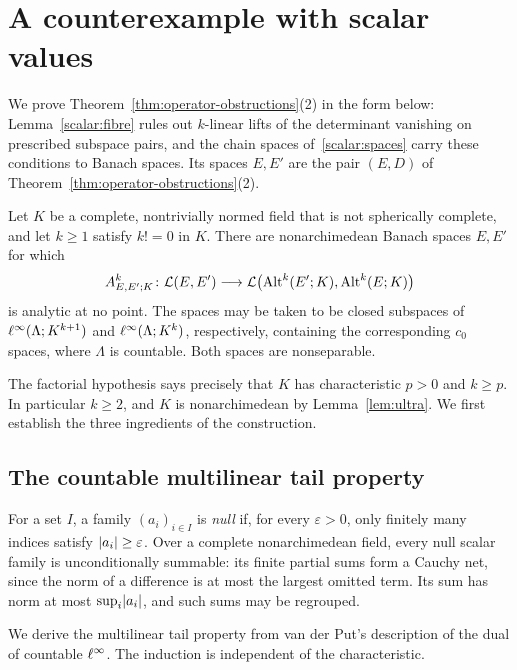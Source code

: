 \section{A counterexample with scalar values}\label{app:scalar}

We prove Theorem~\ref{thm:operator-obstructions}(2) in the form below: Lemma~\ref{scalar:fibre} rules out $k$\nobreakdash-linear
lifts of the determinant vanishing on prescribed subspace pairs, and the chain spaces of~\eqref{scalar:spaces} carry
these conditions to Banach spaces. Its spaces $E,E'$ are the pair $(E,D)$ of Theorem~\ref{thm:operator-obstructions}(2).

\begin{theorem}\label{thm:scalar-counter}
Let $K$ be a complete, nontrivially normed field that is not spherically complete, and let $k\ge1$ satisfy
$k! = 0$ in $K$. There are nonarchimedean Banach spaces $E,E'$ for which
\[
 A^k_{E,E';K}\colon\mathcal L(E,E')\longrightarrow
 \mathcal L\bigl(\operatorname{Alt}^k(E';K),\operatorname{Alt}^k(E;K)\bigr)
\]
is analytic at no point. The spaces may be taken to be closed subspaces of
$\ell^\infty(\Lambda;K^{k+1})$ and $\ell^\infty(\Lambda;K^k)$, respectively, containing the corresponding $c_0$ spaces,
where $\Lambda$ is countable. Both spaces are nonseparable.
\end{theorem}

The factorial hypothesis says precisely that $K$ has characteristic $p>0$ and $k\ge p$. In particular
$k\ge2$, and $K$ is nonarchimedean by Lemma~\ref{lem:ultra}. We first establish the three ingredients
of the construction.

\subsection{The countable multilinear tail property}

For a set $I$, a family $(a_i)_{i\in I}$ is \emph{null} if, for every $\varepsilon>0$, only finitely many
indices satisfy $\lvert a_i\rvert\ge\varepsilon$. Over a complete nonarchimedean field, every null scalar family
is unconditionally summable: its finite partial sums form a Cauchy net, since the norm of a difference is
at most the largest omitted term. Its sum has norm at most $\sup_i\lvert a_i\rvert$, and such sums may be regrouped.

We derive the multilinear tail property from van der Put's description of the dual of countable $\ell^\infty$. The induction is independent of the characteristic.

